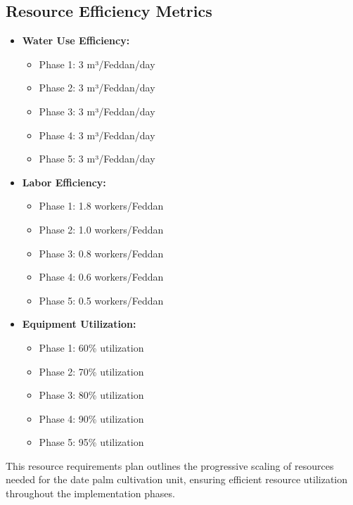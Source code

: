 \subsection{Resource Efficiency Metrics}
\begin{itemize}
    \item \textbf{Water Use Efficiency:}
    \begin{itemize}
        \item Phase 1: 3 m³/Feddan/day
        \item Phase 2: 3 m³/Feddan/day
        \item Phase 3: 3 m³/Feddan/day
        \item Phase 4: 3 m³/Feddan/day
        \item Phase 5: 3 m³/Feddan/day
    \end{itemize}
    \item \textbf{Labor Efficiency:}
    \begin{itemize}
        \item Phase 1: 1.8 workers/Feddan
        \item Phase 2: 1.0 workers/Feddan
        \item Phase 3: 0.8 workers/Feddan
        \item Phase 4: 0.6 workers/Feddan
        \item Phase 5: 0.5 workers/Feddan
    \end{itemize}
    \item \textbf{Equipment Utilization:}
    \begin{itemize}
        \item Phase 1: 60\% utilization
        \item Phase 2: 70\% utilization
        \item Phase 3: 80\% utilization
        \item Phase 4: 90\% utilization
        \item Phase 5: 95\% utilization
    \end{itemize}
\end{itemize}

This resource requirements plan outlines the progressive scaling of resources needed for the date palm cultivation unit, ensuring efficient resource utilization throughout the implementation phases.
